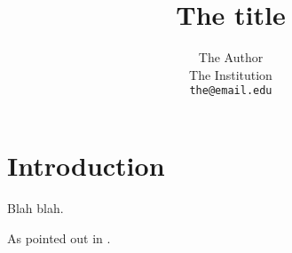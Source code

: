 \documentclass{article}
\title{The title}
\author{The Author\\
  \small{The Institution}\\
  \small{\texttt{the@email.edu}}
}
\begin{document}
\maketitle

\section{Introduction}

Blah blah.

As pointed out in \cite{Reference_One}.

\printbibliography
\end{document}
